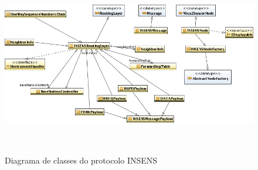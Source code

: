 \begin{figure}[H]
\centering
\includegraphics[height=8cm,width=16cm]{INSENSProtocol_CD.png}
\caption{Diagrama de classes do protocolo INSENS}
\label{fig:INSENS_CD}
\end{figure}